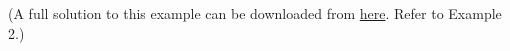 \documentclass[9pt, xcolor={svgnames, x11names},professionalfonts]{beamer}
\def\scale{1}
\begin{document}

\begin{frame}%

	\begin{myexam}{}{}
		\def\scale{0.9}
		\centering
		

	\end{myexam}

\end{frame}



\begin{frame}%

	\begin{myexam}{}{}
		\def\scale{1}
		\centering
		


		{\scriptsize (A full solution to this example can be downloaded from \href{https://eduk8r.org/statics/sxs/07MoJSxS.pdf}{here}. Refer to Example 2.)}

	\end{myexam}

\end{frame}



\end{document}
